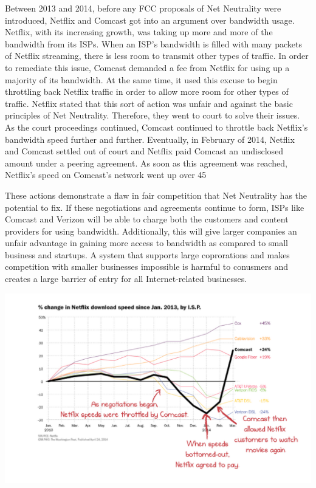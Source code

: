 \documentclass{sigcomm-alternate}
\begin{document}
Between 2013 and 2014, before any FCC proposals of Net Neutrality were introduced, Netflix and Comcast got into an argument over bandwidth usage. Netflix, with its increasing growth, was taking up more and more of the bandwidth from its ISPs. When an ISP’s bandwidth is filled with many packets of Netflix streaming, there is less room to transmit other types of traffic. In order to remediate this issue, Comcast demanded a fee from Netflix for using up a majority of its bandwidth. At the same time, it used this excuse to begin throttling back Netflix traffic in order to allow more room for other types of traffic. Netflix stated that this sort of action was unfair and against the basic principles of Net Neutrality. Therefore, they went to court to solve their issues. As the court proceedings continued, Comcast continued to throttle back Netflix’s bandwidth speed further and further. Eventually, in February of 2014, Netflix and Comcast settled out of court and Netflix paid Comcast an undisclosed amount under a peering agreement. As soon as this agreement was reached, Netflix’s speed on Comcast’s network went up over 45%

These actions demonstrate a flaw in fair competition that Net Neutrality has the potential to fix. If these negotiations and agreements continue to form, ISPs like Comcast and Verizon will be able to charge both the customers and content providers for using bandwidth. Additionally, this will give larger companies an unfair advantage in gaining more access to bandwidth as compared to small business and startups. A system that supports large coprorations and makes competition with smaller businesses impossible is harmful to conusmers and creates a large barrier of entry for all Internet-related businesses.


\hspace*{-2cm}
\includegraphics[scale=.20]{NetflixGraph.png}
\end{document}
